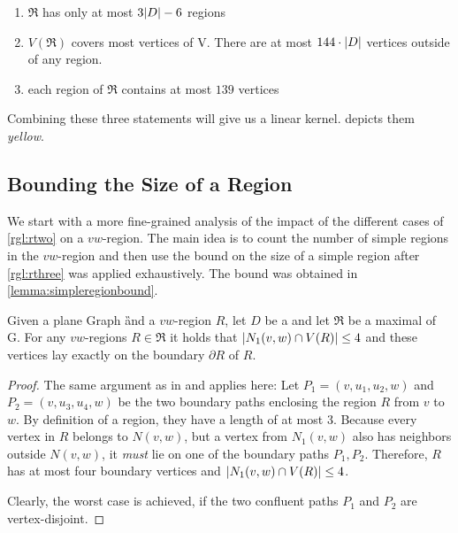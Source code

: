 \begin{enumerate}[topsep=0pt,itemsep=-1ex,partopsep=1ex,parsep=1ex]
    \item $\mathfrak{R}$ has only at most $3 \abs{D} - 6$ regions
    \item $V(\mathfrak{R})$ covers most vertices of V. There are at most $144 \cdot \abs{D}$ vertices outside of any region.
    \item each region of $\mathfrak{R}$ contains at most $139$ vertices %
\end{enumerate}

Combining these three statements will give us a linear kernel.  depicts them \textit{yellow}.

\subsection{Bounding the Size of a Region}

We start with a more fine-grained analysis of the impact of the different cases of \cref{rgl:rtwo} on a $vw$-region. The main idea is to count the number of simple regions in the $vw$-region and then use the bound on the size of a simple region after \cref{rgl:rthree} was applied exhaustively. The bound was obtained in \cref{lemma:simpleregionbound}.   

\begin{lemma}\label{lemma:nonecover}
    Given a plane Graph \G and a $vw$-region $R$, let $D$ be a \sdom and let $\mathfrak{R}$ be a maximal \dreg of G. 
    For any $vw$-regions $R \in \mathfrak{R}$ it holds that $\abs{N_1(v,w) \cap V(R)} \leq 4$ and these vertices lay exactly on the boundary $\partial R$ of $R$. 
\end{lemma}
\begin{proof}
The same argument as in \cite{Alber2004} and \cite[Proposition 2, Revision 2018]{Garnero2019} applies here:
Let $P_1 = (v, u_1, u_2,w)$ and $P_2 = (v, u_3, u_4,w)$ be the two boundary paths enclosing the region $R$ from $v$ to $w$. By definition of a region, they have a length of at most 3. Because every vertex in $R$ belongs to $N(v,w)$, but a vertex from $N_1(v,w)$ also has neighbors outside $N(v,w)$, it \emph{must} lie on one of the boundary paths $P_1, P_2$.
Therefore, $R$ has at most four boundary vertices and $\abs{N_1(v,w) \cap V(R)} \leq 4$.

Clearly, the worst case is achieved, if the two confluent paths $P_1$ and $P_2$ are vertex-disjoint. 
\end{proof}

